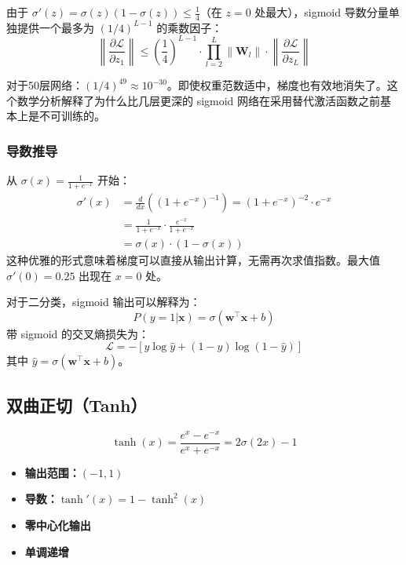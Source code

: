 由于 $\sigma'(z) = \sigma(z)(1-\sigma(z)) \leq \frac{1}{4}$（在 $z=0$ 处最大），sigmoid 导数分量单独提供一个最多为 $(1/4)^{L-1}$ 的乘数因子：
\begin{equation}
\left\|\frac{\partial \mathcal{L}}{\partial z_1}\right\| \leq \left(\frac{1}{4}\right)^{L-1} \cdot \prod_{l=2}^{L} \|\mathbf{W}_l\| \cdot \left\|\frac{\partial \mathcal{L}}{\partial z_L}\right\|
\end{equation}

对于50层网络：$(1/4)^{49} \approx 10^{-30}$。即使权重范数适中，梯度也有效地消失了。这个数学分析解释了为什么比几层更深的 sigmoid 网络在采用替代激活函数之前基本上是不可训练的。

\subsubsection{导数推导}

从 $\sigma(x) = \frac{1}{1 + e^{-x}}$ 开始：
\begin{align}
\sigma'(x) &= \frac{d}{dx}\left((1 + e^{-x})^{-1}\right) = (1 + e^{-x})^{-2} \cdot e^{-x} \\
&= \frac{1}{1 + e^{-x}} \cdot \frac{e^{-x}}{1 + e^{-x}} \\
&= \sigma(x) \cdot (1 - \sigma(x))
\end{align}
这种优雅的形式意味着梯度可以直接从输出计算，无需再次求值指数。最大值 $\sigma'(0) = 0.25$ 出现在 $x = 0$ 处。

\begin{example}[二分类中的Sigmoid]
对于二分类，sigmoid 输出可以解释为：
\begin{equation}
P(y=1|\mathbf{x}) = \sigma(\mathbf{w}^\top \mathbf{x} + b)
\end{equation}
带 sigmoid 的交叉熵损失为：
\begin{equation}
\mathcal{L} = -[y \log \hat{y} + (1-y) \log(1-\hat{y})]
\end{equation}
其中 $\hat{y} = \sigma(\mathbf{w}^\top \mathbf{x} + b)$。
\end{example}

\subsection{双曲正切（Tanh）}

\begin{equation}
\tanh(x) = \frac{e^x - e^{-x}}{e^x + e^{-x}} = 2\sigma(2x) - 1
\end{equation}

\begin{properties}[Tanh的性质]
\begin{itemize}
    \item \textbf{输出范围：}$(-1, 1)$
    \item \textbf{导数：}$\tanh'(x) = 1 - \tanh^2(x)$
    \item \textbf{零中心化输出}
    \item \textbf{单调递增}
\end{itemize}
\end{properties}

